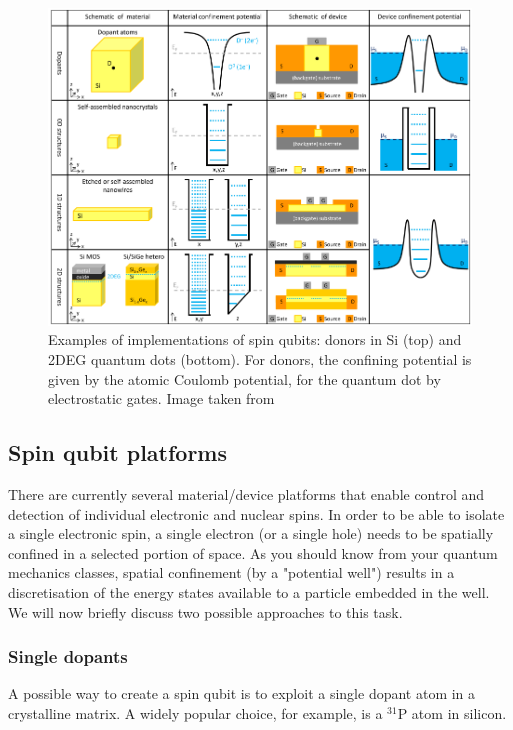 \documentclass[a4paper,11pt]{article}
\begin{document}
\begin{figure}[h]
\centering
\includegraphics[width = 1\textwidth]{figures/confined_structures_Si.png}
\caption{Examples of implementations of spin qubits: donors in Si (top) and 2DEG quantum dots (bottom). For donors, the confining potential is given by the atomic Coulomb potential, for the quantum dot by electrostatic gates. Image taken from \cite{morton_embracing_2011}}
\label{fig:QD_donor}
\end{figure}

\subsection {Spin qubit platforms}
There are currently several material/device platforms that enable control and detection of individual electronic and nuclear spins. In order to be able to isolate a single electronic spin, a single electron (or a single hole) needs to be spatially confined in a selected portion of space. As you should know from your quantum mechanics classes, spatial confinement (by a "potential well") results in a discretisation of the energy states available to a particle embedded in the well.
\newline We will now briefly discuss two possible approaches to this task.
\subsubsection {Single dopants}
A possible way to create a spin qubit is to exploit a single dopant atom in a crystalline matrix. A widely popular choice, for example, is a $^{31}$P atom in silicon.
\end{document}
